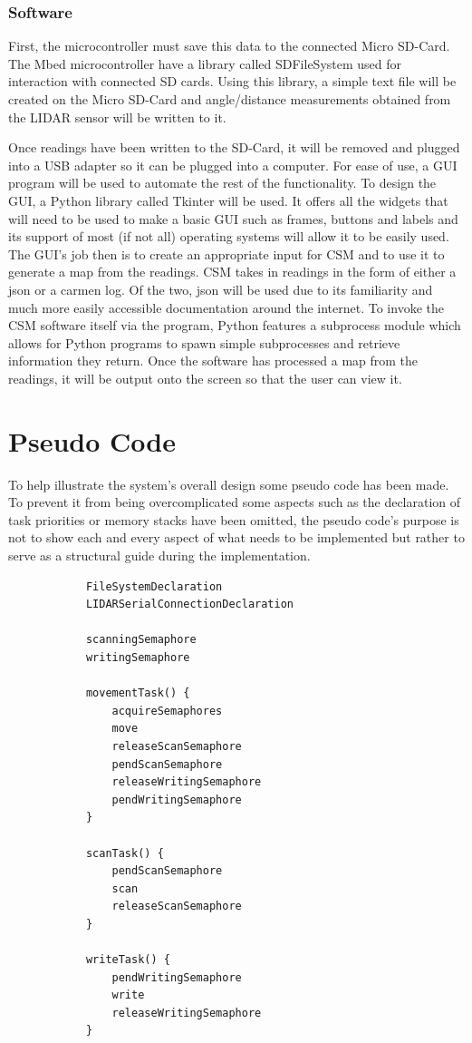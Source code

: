 				\subsubsection{Software}
				First, the microcontroller must save this data to the connected Micro SD-Card. The Mbed microcontroller have a library called SDFileSystem used for interaction with connected SD cards. Using this library, a simple text file will be created on the Micro SD-Card and angle/distance measurements obtained from the LIDAR sensor will be written to it.
				
				Once readings have been written to the SD-Card, it will be removed and plugged into a USB adapter so it can be plugged into a computer. For ease of use, a GUI program will be used to automate the rest of the functionality. To design the GUI, a Python library called Tkinter will be used. It offers all the widgets that will need to be used to make a basic GUI such as frames, buttons and labels and its support of most (if not all) operating systems will allow it to be easily used. The GUI's job then is to create an appropriate input for CSM and to use it to generate a map from the readings. CSM takes in readings in the form of either a json or a carmen log. Of the two, json will be used due to its familiarity and much more easily accessible documentation around the internet. To invoke the CSM software itself via the program, Python features a subprocess module which allows for Python programs to spawn simple subprocesses and retrieve information they return. Once the software has processed a map from the readings, it will be output onto the screen so that the user can view it.
		\newpage
		\section{Pseudo Code}
		To help illustrate the system's overall design some pseudo code has been made. To prevent it from being overcomplicated some aspects such as the declaration of task priorities or memory stacks have been omitted, the pseudo code's purpose is not to show each and every aspect of what needs to be implemented but rather to serve as a structural guide during the implementation.
		\begin{lstlisting}
			FileSystemDeclaration
			LIDARSerialConnectionDeclaration		
			
			scanningSemaphore
			writingSemaphore
			
			movementTask() {
				acquireSemaphores
				move
				releaseScanSemaphore
				pendScanSemaphore
				releaseWritingSemaphore
				pendWritingSemaphore
			}
			
			scanTask() {
				pendScanSemaphore
				scan
				releaseScanSemaphore
			}
			
			writeTask() {
				pendWritingSemaphore
				write
				releaseWritingSemaphore
			}
		\end{lstlisting}
		
